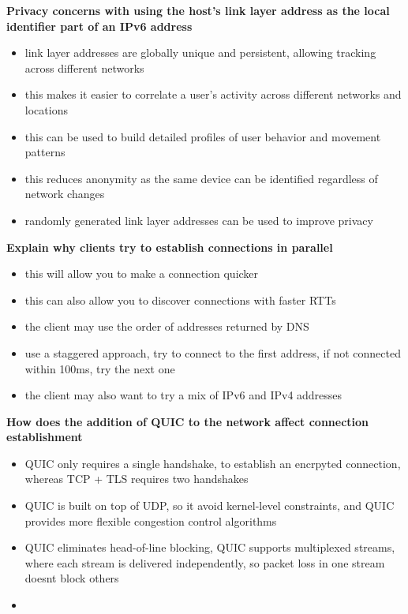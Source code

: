 \documentclass{article}
\begin{document}
\textbf{Privacy concerns with using the host's link layer address as the local identifier part of an IPv6 address}
\begin{itemize}
    \item link layer addresses are globally unique and persistent, allowing tracking across different networks
    \item this makes it easier to correlate a user's activity across different networks and locations
    \item this can be used to build detailed profiles of user behavior and movement patterns
    \item this reduces anonymity as the same device can be identified regardless of network changes
    \item randomly generated link layer addresses can be used to improve privacy
\end{itemize}


\textbf{Explain why clients try to establish connections in parallel}
\begin{itemize}
    \item this will allow you to make a connection quicker
    \item this can also allow you to discover connections with faster RTTs
    \item the client may use the order of addresses returned by DNS
    \item use a staggered approach, try to connect to the first address, if not connected within 100ms, try the next one
    \item the client may also want to try a mix of IPv6 and IPv4 addresses
\end{itemize}

\textbf{How does the addition of QUIC to the network affect connection establishment}
\begin{itemize}
    \item QUIC only requires a single handshake, to establish an encrpyted connection, whereas TCP + TLS requires two handshakes
    \item QUIC is built on top of UDP, so it avoid kernel-level constraints, and QUIC provides more flexible congestion control algorithms
    \item QUIC eliminates head-of-line blocking, QUIC supports multiplexed streams, where each stream is delivered independently, so packet loss in one stream doesnt block others
    \item
\end{itemize}
\end{document}
